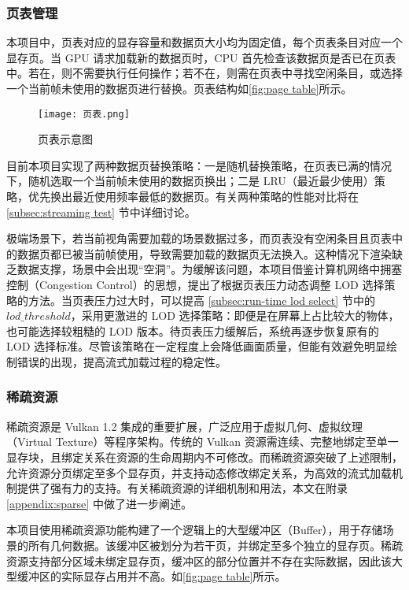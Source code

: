 \subsubsection{页表管理}

本项目中，页表对应的显存容量和数据页大小均为固定值，每个页表条目对应一个显存页。当 GPU 请求加载新的数据页时，CPU 首先检查该数据页是否已在页表中。若在，则不需要执行任何操作；若不在，则需在页表中寻找空闲条目，或选择一个当前帧未使用的数据页进行替换。页表结构如\autoref{fig:page table}所示。

\begin{figure}[htbp]
\centering
\texttt{[image: 页表.png]}
\caption{\label{fig:page table}页表示意图}
\end{figure}

目前本项目实现了两种数据页替换策略：一是随机替换策略，在页表已满的情况下，随机选取一个当前帧未使用的数据页换出；二是 LRU（最近最少使用）策略，优先换出最近使用频率最低的数据页。有关两种策略的性能对比将在 \ref{subsec:streaming test} 节中详细讨论。

极端场景下，若当前视角需要加载的场景数据过多，而页表没有空闲条目且页表中的数据页都已被当前帧使用，导致需要加载的数据页无法换入。这种情况下渲染缺乏数据支撑，场景中会出现“空洞”。为缓解该问题，本项目借鉴计算机网络中拥塞控制（Congestion Control）的思想\cite{Wiki-congestion}，提出了根据页表压力动态调整 LOD 选择策略的方法。当页表压力过大时，可以提高 \ref{subsec:run-time lod select} 节中的 $lod\_threshold$，采用更激进的 LOD 选择策略：即便是在屏幕上占比较大的物体，也可能选择较粗糙的 LOD 版本。待页表压力缓解后，系统再逐步恢复原有的 LOD 选择标准。尽管该策略在一定程度上会降低画面质量，但能有效避免明显绘制错误的出现，提高流式加载过程的稳定性。

\subsubsection{稀疏资源}

稀疏资源是 Vulkan 1.2 集成的重要扩展，广泛应用于虚拟几何、虚拟纹理（Virtual Texture）等程序架构\cite{SparseResources}。传统的 Vulkan 资源需连续、完整地绑定至单一显存块，且绑定关系在资源的生命周期内不可修改。而稀疏资源突破了上述限制，允许资源分页绑定至多个显存页，并支持动态修改绑定关系，为高效的流式加载机制提供了强有力的支持。有关稀疏资源的详细机制和用法，本文在附录 \ref{appendix:sparse} 中做了进一步阐述。

本项目使用稀疏资源功能构建了一个逻辑上的大型缓冲区（Buffer），用于存储场景的所有几何数据。该缓冲区被划分为若干页，并绑定至多个独立的显存页。稀疏资源支持部分区域未绑定显存页，缓冲区的部分位置并不存在实际数据，因此该大型缓冲区的实际显存占用并不高。如\autoref{fig:page table}所示。

